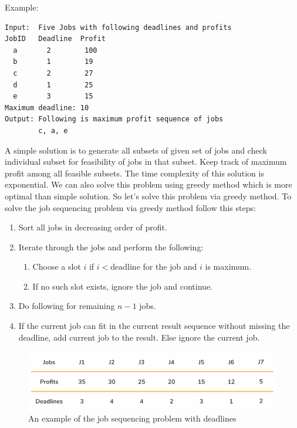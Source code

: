 \documentclass[a4paper,11pt]{book}
\begin{document}
\vspace{5mm}

\noindent Example:
\begin{lstlisting}
Input:  Five Jobs with following deadlines and profits
JobID   Deadline  Profit
  a       2        100
  b       1        19
  c       2        27
  d       1        25
  e       3        15
Maximum deadline: 10
Output: Following is maximum profit sequence of jobs
        c, a, e
\end{lstlisting}

\noindent A simple solution is to generate all subsets of given set of jobs and check individual subset for feasibility of jobs in that subset. Keep track of maximum profit among all feasible subsets. The time complexity of this solution is exponential. We can also solve this problem using greedy method which is more optimal than simple solution. So let's solve this problem via greedy method. 
To solve the job sequencing problem via greedy method follow this steps:

\begin{enumerate}
    \item Sort all jobs in decreasing order of profit.
    \item Iterate through the jobs and perform the following:
    \begin{enumerate}
        \item Choose a slot $i$ if $i<\text{deadline}$ for the job and $i$ is maximum.
        \item If no such slot exists, ignore the job and continue.
    \end{enumerate}
    \item Do following for remaining $n-1$ jobs.
    \item If the current job can fit in the current result sequence without missing the deadline, add current job to the result. Else ignore the current job.
\end{enumerate}

\begin{figure}[ht]
	\centering
	\includegraphics[scale=0.35]{code/sort/pic/job1.png}
	\caption{An example of the job sequencing problem with deadlines}
\end{figure}
\end{document}
